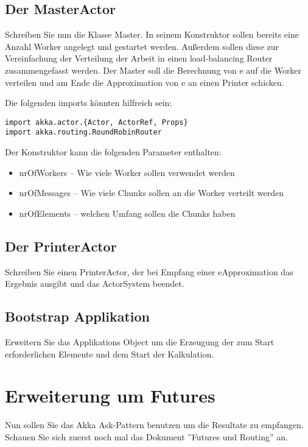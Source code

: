 \documentclass[11pt]{tudexercise}
\begin{document}
\subsection{Der MasterActor}

Schreiben Sie nun die Klasse Master. In seinem Konstruktor sollen bereits eine Anzahl Worker angelegt und gestartet werden. Außerdem sollen diese zur Vereinfachung der Verteilung der Arbeit in einen load-balancing Router zusammengefasst werden. Der Master soll die Berechnung von e auf die Worker verteilen und am Ende die Approximation von e an einen Printer schicken.

Die folgenden imports könnten hilfreich sein:
\begin{verbatim}
import akka.actor.{Actor, ActorRef, Props}
import akka.routing.RoundRobinRouter
\end{verbatim}

Der Konstruktor kann die folgenden Parameter enthalten:
\begin{itemize}
\item nrOfWorkers – Wie viele Worker sollen verwendet werden
\item nrOfMessages – Wie viele Chunks sollen an die Worker verteilt werden
\item nrOfElements – welchen Umfang sollen die Chunks haben
\end{itemize}

\subsection{Der PrinterActor}

Schreiben Sie einen PrinterActor, der bei Empfang einer eApproximation das Ergebnis ausgibt und das ActorSystem beendet.

\subsection{Bootstrap Applikation}

Erweitern Sie das Applikations Object um die Erzeugung der zum Start erforderlichen Elemente und dem Start der Kalkulation.

\section{Erweiterung um Futures}

Nun sollen Sie das Akka Ask-Pattern benutzen um die Resultate zu empfangen. Schauen Sie sich zuerst noch mal das Dokument ''Futures und Routing'' an.
\end{document}
